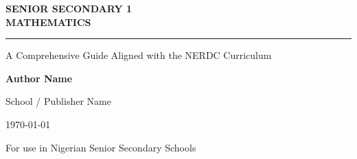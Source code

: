 
\begin{titlepage}
    \centering
    \vspace*{3cm}

    {\Huge \bfseries \color{primary} SENIOR SECONDARY 1 \\ MATHEMATICS \par}
    \vspace{0.5cm}
    \textcolor{secondary!80!black}{\rule{0.6\textwidth}{1.5pt}}
    \vspace{1.5cm}

    {\Large A Comprehensive Guide Aligned with the NERDC Curriculum \par}
    \vspace{3cm}

    {\Large \bfseries Author Name \par}
    \vspace{0.5cm}
    {\large School / Publisher Name \par}
    \vspace{1cm}
    {\large \today \par}

    \vfill
    {\normalsize For use in Nigerian Senior Secondary Schools \par}
\end{titlepage}
